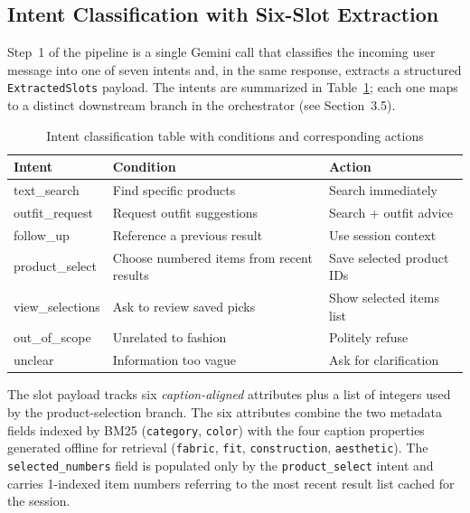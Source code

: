 \subsection{Intent Classification with Six-Slot Extraction}
\label{subsec:intent_classification}

Step~1 of the pipeline is a single Gemini call that classifies the incoming user message into one of seven intents and, in the same response, extracts a structured \texttt{ExtractedSlots} payload. The intents are summarized in Table~\ref{tab:intent_table}; each one maps to a distinct downstream branch in the orchestrator (see Section~3.5).

\begin{table}[H]
\centering
\begin{tabular}{p{2.9cm}p{4.8cm}p{4.8cm}}
\toprule
\textbf{Intent} & \textbf{Condition} & \textbf{Action}\\
\midrule
text\_search    & Find specific products                    & Search immediately\\
outfit\_request & Request outfit suggestions                & Search + outfit advice\\
follow\_up      & Reference a previous result               & Use session context\\
product\_select & Choose numbered items from recent results & Save selected product IDs\\
view\_selections & Ask to review saved picks                & Show selected items list\\
out\_of\_scope  & Unrelated to fashion                      & Politely refuse\\
unclear         & Information too vague                     & Ask for clarification\\
\bottomrule
\end{tabular}
\caption{Intent classification table with conditions and corresponding actions}
\label{tab:intent_table}
\end{table}

The slot payload tracks six \emph{caption-aligned} attributes plus a list of integers used by the product-selection branch. The six attributes combine the two metadata fields indexed by BM25 (\texttt{category}, \texttt{color}) with the four caption properties generated offline for retrieval (\texttt{fabric}, \texttt{fit}, \texttt{construction}, \texttt{aesthetic}). The \texttt{selected\_numbers} field is populated only by the \texttt{product\_select} intent and carries 1-indexed item numbers referring to the most recent result list cached for the session.

